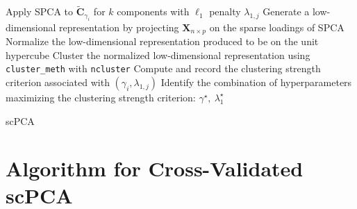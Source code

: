 \documentclass{article}
\begin{document}
\begin{algorithm}[!htbp]
{{      Apply SPCA to $\widetilde{\mathbf{C}}_{\gamma_i}$ for $k$ components with $\ell_1$ penalty $\lambda_{1, j}$\;
      Generate a low-dimensional representation by projecting $\mathbf{X}_{n \times p}$ on the sparse loadings of SPCA\;
      Normalize the low-dimensional representation produced to be on the unit hypercube\;
      Cluster the normalized low-dimensional representation using \texttt{cluster\_meth} with \texttt{ncluster}\;
      Compute and record the clustering strength criterion associated with
      $(\gamma_i, \lambda_{1, j})$ \;
    }
  }
  Identify the combination of hyperparameters maximizing the clustering strength
  criterion: $\gamma^{\star},\: \lambda_1^{\star}$ \;
  \caption{scPCA}
\end{algorithm}


\newpage
\section{Algorithm for Cross-Validated scPCA}\label{algo2}
\end{document}
